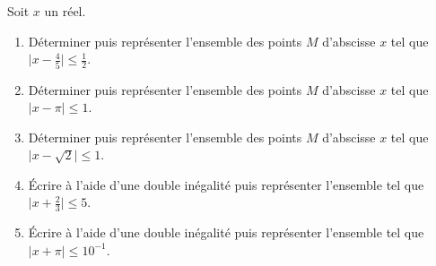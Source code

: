 
Soit $x$ un réel.   


\begin{enumerate}
	\item Déterminer puis représenter l'ensemble des points $M$ d'abscisse $x$ tel que $\vert x - \frac{4}{5} \vert \leq \frac{1}{2}$.
    \item Déterminer puis représenter l'ensemble des points $M$ d'abscisse $x$ tel que $\vert x- \pi \vert \leq 1$.
	\item Déterminer puis représenter l'ensemble des points $M$ d'abscisse $x$ tel que $\vert x - \sqrt{2}  \vert \leq  1$.
	\item Écrire à l'aide d'une double inégalité puis représenter  l'ensemble tel  que $\vert x + \frac{2}{3} \vert \leq 5$.
	\item Écrire à l'aide d'une double inégalité puis représenter  l'ensemble tel  que $\vert x+ \pi \vert \leq 10^{-1}$.	
\end{enumerate}

